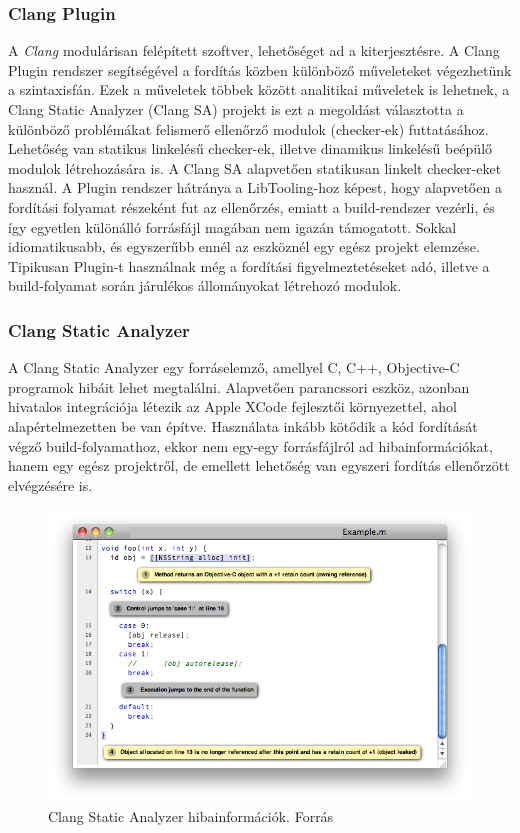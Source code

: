 \documentclass[a4paper,12pt]{report}
\begin{document}
\subsubsection{Clang Plugin}
A \emph{Clang} modulárisan felépített szoftver, lehetőséget ad a kiterjesztésre. A Clang Plugin rendszer segítségével a fordítás közben különböző műveleteket végezhetünk a szintaxisfán. Ezek a műveletek többek között analitikai műveletek is lehetnek, a Clang Static Analyzer (Clang SA) projekt is ezt a megoldást választotta a különböző problémákat felismerő ellenőrző modulok (checker-ek) futtatásához. Lehetőség van statikus linkelésű checker-ek, illetve dinamikus linkelésű beépülő modulok létrehozására is. A Clang SA alapvetően statikusan linkelt checker-eket használ. A Plugin rendszer hátránya a LibTooling-hoz képest, hogy alapvetően a fordítási folyamat részeként fut az ellenőrzés, emiatt a build-rendszer vezérli, és így egyetlen különálló forrásfájl magában nem igazán támogatott. Sokkal idiomatikusabb, és egyszerűbb ennél az eszköznél egy egész projekt elemzése. Tipikusan Plugin-t használnak még a fordítási figyelmeztetéseket adó, illetve a build-folyamat során járulékos állományokat létrehozó modulok.

\subsubsection{Clang Static Analyzer}
A Clang Static Analyzer egy forráselemző, amellyel C, C++, Objective-C programok hibáit lehet megtalálni. Alapvetően parancssori eszköz, azonban hivatalos integrációja létezik az Apple XCode fejlesztői környezettel, ahol alapértelmezetten be van építve. Használata inkább kötődik a kód fordítását végző build-folyamathoz, ekkor nem egy-egy forrásfájlról ad hibainformációkat, hanem egy egész projektről, de emellett lehetőség van egyszeri fordítás ellenőrzött elvégzésére is.

\begin{figure}[h]
\caption{Clang Static Analyzer hibainformációk. Forrás \cite{clangsaimage}}
\centering
\includegraphics[scale=0.6]{analyzer_html.png}
\end{figure}
\end{document}
